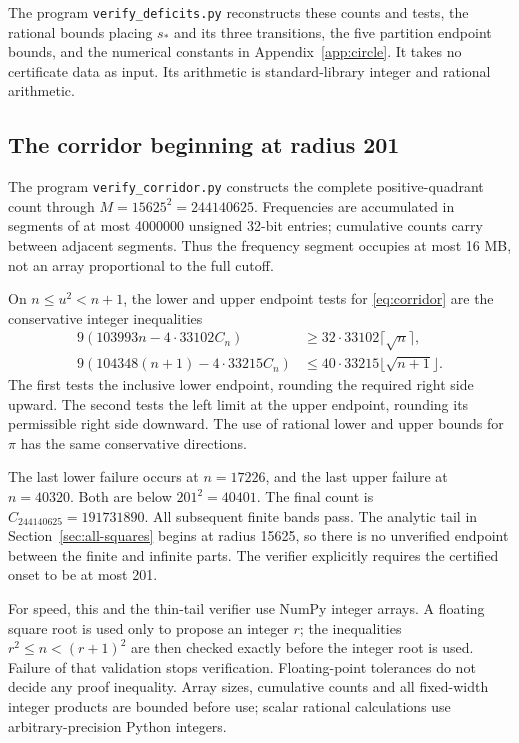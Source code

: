 \documentclass[11pt,reqno]{amsart}
\numberwithin{equation}{section}
\begin{document}
The program \texttt{verify\_deficits.py} reconstructs these
counts and tests, the rational bounds placing $s_*$ and its
three transitions, the five partition endpoint bounds,
and the numerical constants in Appendix~\ref{app:circle}.
It takes no certificate data as input. Its arithmetic is
standard-library integer and rational arithmetic.

\subsection*{The corridor beginning at radius 201}

The program \texttt{verify\_corridor.py} constructs the
complete positive-quadrant count through
$M=15625^2=244140625$. Frequencies are accumulated in
segments of at most 4000000 unsigned 32-bit entries;
cumulative counts carry between adjacent segments.
Thus the frequency segment occupies at most 16 MB, not an
array proportional to the full cutoff.

On $n\le u^2<n+1$, the lower and upper endpoint tests
for \eqref{eq:corridor} are the conservative integer
inequalities
\begin{align}
 9(103993n-4\cdot33102C_n)
     &\ge32\cdot33102\lceil\sqrt n\rceil,
                  \label{eq:corridor-low-test}\\
 9(104348(n+1)-4\cdot33215C_n)
     &\le40\cdot33215\lfloor\sqrt{n+1}\rfloor.
                  \label{eq:corridor-high-test}
\end{align}
The first tests the inclusive lower endpoint, rounding the
required right side upward. The second tests the left limit
at the upper endpoint, rounding its permissible right side
downward. The use of rational lower and upper bounds for
$\pi$ has the same conservative directions.

The last lower failure occurs at $n=17226$, and the last
upper failure at $n=40320$. Both are below $201^2=40401$.
The final count is $C_{244140625}=191731890$.
All subsequent finite bands pass. The analytic tail in
Section~\ref{sec:all-squares} begins at radius 15625, so
there is no unverified endpoint between the finite and
infinite parts. The verifier explicitly requires the
certified onset to be at most 201.

For speed, this and the thin-tail verifier use NumPy
integer arrays. A floating square root is used only to
propose an integer $r$; the inequalities
$r^2\le n<(r+1)^2$ are then checked exactly before the
integer root is used. Failure of that validation stops
verification. Floating-point tolerances do not decide
any proof inequality. Array sizes, cumulative counts
and all fixed-width integer products are bounded before
use; scalar rational calculations use arbitrary-precision
Python integers.
\end{document}
